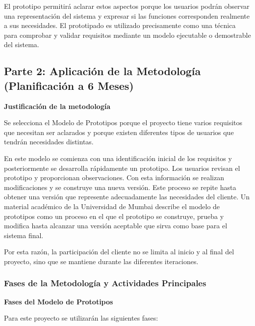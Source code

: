 \documentclass[pdflatex,sn-mathphys-num]{sn-jnl}%
\theoremstyle{thmstyleone}%
\theoremstyle{thmstyletwo}%
\theoremstyle{thmstylethree}%
\begin{document}
 El prototipo permitirá aclarar estos aspectos porque los usuarios podrán observar una representación del sistema y expresar si las funciones corresponden realmente a sus necesidades. El prototipado es utilizado precisamente como una técnica para comprobar y validar requisitos mediante un modelo ejecutable o demostrable del sistema.
 
 
 \subsection{Parte 2: Aplicación de la Metodología (Planificación a 6 Meses)}
 
 \textbf{Justificación de la metodología}

 Se selecciona el Modelo de Prototipos porque el proyecto tiene varios requisitos que necesitan ser aclarados y porque existen diferentes tipos de usuarios que tendrán necesidades distintas.
 
 En este modelo se comienza con una identificación inicial de los requisitos y posteriormente se desarrolla rápidamente un prototipo. Los usuarios revisan el prototipo y proporcionan observaciones. Con esta información se realizan modificaciones y se construye una nueva versión. Este proceso se repite hasta obtener una versión que represente adecuadamente las necesidades del cliente. Un material académico de la Universidad de Mumbai describe el modelo de prototipos como un proceso en el que el prototipo se construye, prueba y modifica hasta alcanzar una versión aceptable que sirva como base para el sistema final.
 
 Por esta razón, la participación del cliente no se limita al inicio y al final del proyecto, sino que se mantiene durante las diferentes iteraciones.
 
 \subsubsection{Fases de la Metodología y Actividades Principales}
 
  \textbf{Fases del Modelo de Prototipos}
 
 Para este proyecto se utilizarán las siguientes fases:
 
\end{document}
